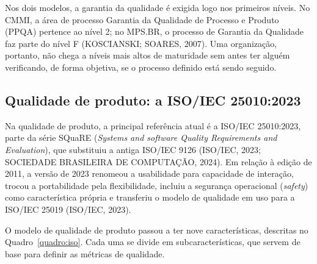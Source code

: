 \documentclass[12pt,a4paper]{article}
\begin{document}
Nos dois modelos, a garantia da qualidade é exigida logo nos primeiros níveis. No CMMI, a área de processo Garantia da Qualidade de Processo e Produto (PPQA) pertence ao nível 2; no MPS.BR, o processo de Garantia da Qualidade faz parte do nível F (KOSCIANSKI; SOARES, 2007). Uma organização, portanto, não chega a níveis mais altos de maturidade sem antes ter alguém verificando, de forma objetiva, se o processo definido está sendo seguido.

\subsection{Qualidade de produto: a ISO/IEC 25010:2023}

Na qualidade de produto, a principal referência atual é a ISO/IEC 25010:2023, parte da série SQuaRE (\textit{Systems and software Quality Requirements and Evaluation}), que substituiu a antiga ISO/IEC 9126 (ISO/IEC, 2023; SOCIEDADE BRASILEIRA DE COMPUTAÇÃO, 2024). Em relação à edição de 2011, a versão de 2023 renomeou a usabilidade para capacidade de interação, trocou a portabilidade pela flexibilidade, incluiu a segurança operacional (\textit{safety}) como característica própria e transferiu o modelo de qualidade em uso para a ISO/IEC 25019 (ISO/IEC, 2023).

O modelo de qualidade de produto passou a ter nove características, descritas no Quadro~\ref{quadro:iso}. Cada uma se divide em subcaracterísticas, que servem de base para definir as métricas de qualidade.
\end{document}
